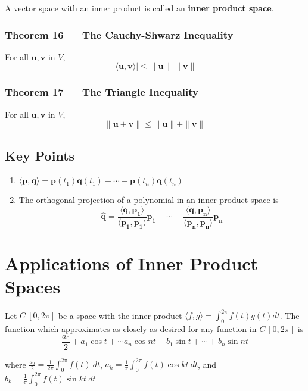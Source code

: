 \documentclass{article}
\begin{document}
A vector space with an inner product is called an \textbf{inner product space}.

\subsubsection*{Theorem 16 --- The Cauchy-Shwarz Inequality}
For all $\mathbf{u}, \mathbf{v}$ in $V$,
\[|\langle\mathbf{u},\mathbf{v}\rangle |\leq\|\mathbf{u}\|\:\|\mathbf{v}\|\]

\subsubsection*{Theorem 17 --- The Triangle Inequality}
For all $\mathbf{u}, \mathbf{v}$ in $V$,
\[\|\mathbf{u} + \mathbf{v}\| \leq \|\mathbf{u}\| + \|\mathbf{v}\|\]

\subsection*{Key Points}
\begin{enumerate}
    \item $\langle\mathbf{p},\mathbf{q}\rangle=\mathbf{p}(t_1)\mathbf{q}(t_1) + \cdots +
    \mathbf{p}(t_n)\mathbf{q}(t_n)$
    \item The orthogonal projection of a polynomial in an inner product space is 
    \[\mathbf{\hat{q}}=\frac{\langle\mathbf{q},\mathbf{p_1}\rangle}{\langle\mathbf{p_1},
    \mathbf{p_1}\rangle} \mathbf{p_1} + \cdots + \frac{\langle\mathbf{q},\mathbf{p_n}\rangle}
    {\langle\mathbf{p_n}, \mathbf{p_n}\rangle} \mathbf{p_n}\]
\end{enumerate}

\section*{Applications of Inner Product Spaces}

Let $C\:[0,2\pi]$ be a space with the inner product
$\langle f, g \rangle = \int_0^{2\pi} f(t)g(t)dt$. The function which approximates as closely as
desired for any function in $C\:[0,2\pi]$ is 
\[\frac{a_0}{2} + a_1\cos t + \cdots a_n \cos nt + b_1 \sin t + \cdots + b_n \sin nt\]

where $\frac{a_0}{2} = \frac{1}{2\pi}\int_0^{2\pi} f(t) \: dt$,
$a_k=\frac{1}{\pi}\int_0^{2\pi}f(t)\cos kt \: dt$, and
$b_k=\frac{1}{\pi}\int_0^{2\pi}f(t)\sin kt \: dt$
\end{document}
